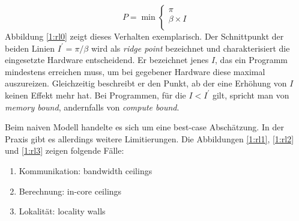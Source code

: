 		\begin{equation}
			P = \min \left\{ \begin{array}{ll} \pi \\
			\beta\times I \\ \end{array}\right.
		\end{equation}
		Abbildung \ref{1:rl0} zeigt dieses Verhalten exemplarisch. Der Schnittpunkt der beiden Linien $I^{\prime} = \pi/\beta$ wird als \textit{ridge point} bezeichnet und charakterisiert die eingesetzte Hardware entscheidend. Er bezeichnet jenes $I$, das ein Programm mindestens erreichen muss, um bei gegebener Hardware diese maximal auszureizen. Gleichzeitig beschreibt er den Punkt, ab der eine Erhöhung von $I$ keinen Effekt mehr hat. Bei Programmen, für die $I < I^{\prime}$ gilt, spricht man von \textit{memory bound}, andernfalls von \textit{compute bound}.
		
		Beim naiven Modell handelte es sich um eine best-case Abschätzung. In der Praxis gibt es allerdings weitere Limitierungen. Die Abbildungen \ref{1:rl1}, \ref{1:rl2} und \ref{1:rl3} zeigen folgende Fälle:
		
		\begin{enumerate}		
		\item Kommunikation: bandwidth ceilings
		\item Berechnung: in-core ceilings
		\item Lokalität: locality walls
		\end{enumerate}	
